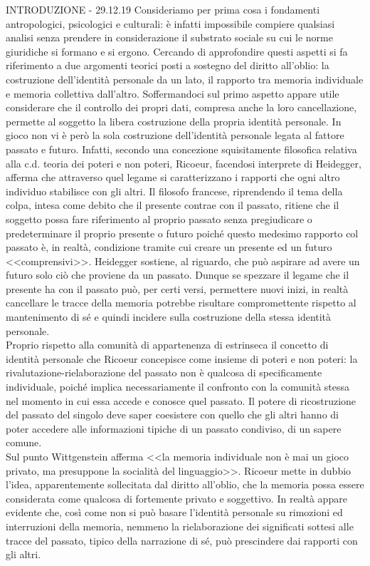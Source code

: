 {INTRODUZIONE - 29.12.19}
Consideriamo per prima cosa i fondamenti antropologici, psicologici e culturali: è infatti impossibile compiere qualsiasi analisi senza prendere in considerazione il substrato sociale su cui le norme giuridiche si formano e si ergono. Cercando  di approfondire questi aspetti si fa riferimento a due argomenti teorici posti a sostegno del diritto all'oblio: la costruzione dell'identità personale da un lato, il rapporto tra memoria individuale e memoria collettiva dall'altro.
Soffermandoci sul primo aspetto appare utile considerare che il controllo dei propri dati, compresa anche la loro cancellazione, permette al soggetto la libera costruzione della propria identità personale. In gioco non vi è però la sola costruzione dell'identità personale legata al fattore passato e futuro. Infatti, secondo una concezione squisitamente filosofica relativa alla c.d. teoria dei poteri e non poteri, Ricoeur, facendosi interprete di Heidegger, afferma che attraverso quel legame si caratterizzano i rapporti che ogni altro individuo stabilisce con gli altri.
Il filosofo francese, riprendendo il tema della colpa, intesa come debito che il presente contrae con il passato, ritiene che il soggetto possa fare riferimento al proprio passato senza pregiudicare o predeterminare il proprio presente o futuro poiché questo medesimo rapporto col passato è, in realtà, condizione tramite cui creare un presente ed un futuro <<comprensivi>>.
Heidegger sostiene, al riguardo, che può aspirare ad avere un futuro solo ciò che proviene da un passato. Dunque se spezzare il legame che il presente ha con il passato può, per certi versi, permettere nuovi inizi, in realtà cancellare le tracce della memoria potrebbe risultare compromettente rispetto al mantenimento di sé e quindi incidere sulla costruzione della stessa identità personale.
\\ Proprio rispetto alla comunità di appartenenza di estrinseca il concetto di identità personale che Ricoeur concepisce come insieme di poteri e non poteri: la rivalutazione-rielaborazione del passato non è qualcosa di specificamente individuale, poiché implica necessariamente il confronto con la comunità stessa nel momento in cui essa accede e conosce quel passato. Il potere di ricostruzione del passato del singolo deve saper coesistere con quello che gli altri hanno di poter accedere alle informazioni tipiche di un passato condiviso, di un sapere comune.
\\Sul punto Wittgenstein afferma <<la memoria individuale non è mai un gioco privato, ma presuppone la socialità del linguaggio>>. Ricoeur mette in dubbio l'idea, apparentemente sollecitata dal diritto all'oblio, che la memoria possa essere considerata come qualcosa di fortemente privato e soggettivo. In realtà appare evidente che, così come non si può basare l'identità personale su rimozioni ed interruzioni della memoria, nemmeno la rielaborazione dei significati sottesi alle tracce del passato, tipico della narrazione di sé, può prescindere dai rapporti con gli altri.
